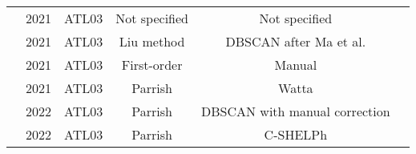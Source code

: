 \begin{table}
\begin{tabular}{rccccc}
            \citeauthor{Lee2021}               & 2021 & ATL03   & Not specified                 & Not specified                 \\ 
            \citeauthor{Liu2021}               & 2021 & ATL03   & Liu method                    & DBSCAN after Ma et al.        \\ 
            \citeauthor{Coveney2021a}          & 2021 & ATL03   & First-order                   & Manual                        \\ 
            \citeauthor{Datta2021}             & 2021 & ATL03   & Parrish                       & Watta                         \\ 
            \citeauthor{LeQuilleuc2022b}       & 2022 & ATL03   & Parrish                       & DBSCAN with manual correction \\ 
            \citeauthor{Thomas2022}            & 2022 & ATL03   & Parrish                       & C-SHELPh                      \\
            \bottomrule
      \end{tabular}
\end{table}
